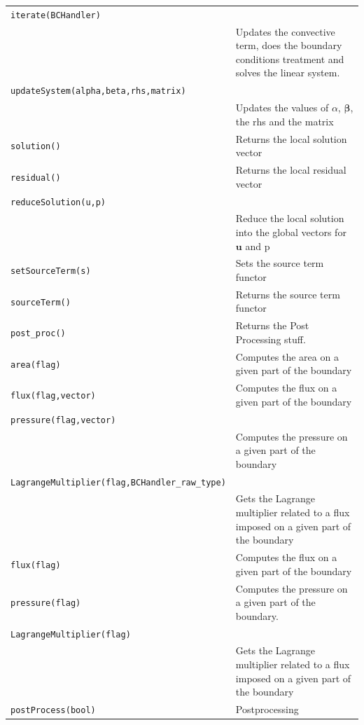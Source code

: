 \documentclass[11pt]{article}
\begin{document}
\begin{center}
\begin{longtable}{p{3cm}p{8cm}}
	\hline
	\texttt{iterate(BCHandler)} \\
	& Updates the convective term, does the boundary conditions treatment and solves the linear system.\\
	\texttt{updateSystem(alpha,beta,rhs,matrix)} \\
	& Updates the values of $\alpha$, $\boldsymbol{\beta}$, the rhs and the matrix \\
	\texttt{solution()} & Returns the local solution vector\\
	\texttt{residual()} & Returns the local residual vector\\
	\texttt{reduceSolution(u,p)} \\
	& Reduce the local solution into the global vectors for $\mathbf{u}$ and p\\
	\texttt{setSourceTerm(s)} & Sets the source term functor\\
	\texttt{sourceTerm()} & Returns the source term functor\\
	\texttt{post\_proc()} & Returns the Post Processing stuff.\\
	\texttt{area(flag)} & Computes the area on a given part of the boundary\\
	\texttt{flux(flag,vector)} & Computes the flux on a given part of the boundary\\
	\texttt{pressure(flag,vector)} \\
	& Computes the pressure on a given part of the boundary\\
	\texttt{LagrangeMultiplier(flag,BCHandler\_raw\_type)} \\
	& Gets the Lagrange multiplier related to a flux imposed on a given part of the boundary\\
	\texttt{flux(flag)} & Computes the flux on a given part of the boundary\\
	\texttt{pressure(flag)} & Computes the pressure on a given part of the boundary.\\
	\texttt{LagrangeMultiplier(flag)} \\
	& Gets the Lagrange multiplier related to a flux imposed on a given part of the boundary\\
	\texttt{postProcess(bool)} & Postprocessing\\
	\hline
\end{longtable}
\end{center}
\end{document}
